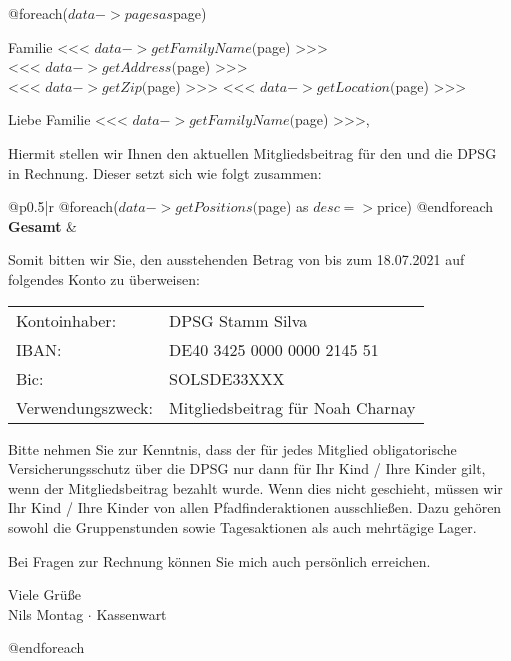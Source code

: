 \documentclass[silvaletter,12pt]{scrlttr2}
\begin{document}
@foreach($data->pages as $page)
\begin{letter}{Familie <<< $data->getFamilyName($page) >>>\\<<< $data->getAddress($page) >>>\\<<< $data->getZip($page) >>> <<< $data->getLocation($page) >>>}
    \sffamily
    \gdef\TotalHT{0}
    \opening{Liebe Familie <<< $data->getFamilyName($page) >>>,}

    Hiermit stellen wir Ihnen den aktuellen Mitgliedsbeitrag für den  und die DPSG in Rechnung. Dieser setzt sich wie folgt zusammen:

    \begin{center}
        \begin{tabular}{@{}p{}|r}
            @foreach($data->getPositions($page) as $desc => $price)
            @endforeach
            \hline
            \textbf{Gesamt} & \textbf{\numprint[€]{\TotalHT}} \\
        \end{tabular}
    \end{center}

    Somit bitten wir Sie, den ausstehenden Betrag von \totalttc bis zum 18.07.2021 auf folgendes Konto zu überweisen:

    \begin{tabular}{ll}
        Kontoinhaber: & DPSG Stamm Silva \\
        IBAN: & DE40 3425 0000 0000 2145 51 \\
        Bic: & SOLSDE33XXX \\
        Verwendungszweck: & Mitgliedsbeitrag für Noah Charnay
    \end{tabular}

    Bitte nehmen Sie zur Kenntnis, dass der für jedes Mitglied obligatorische Versicherungsschutz über die DPSG nur dann für Ihr Kind / Ihre Kinder gilt, wenn der Mitgliedsbeitrag bezahlt wurde. Wenn dies nicht geschieht, müssen wir Ihr Kind / Ihre Kinder von allen Pfadfinderaktionen ausschließen. Dazu gehören sowohl die Gruppenstunden sowie Tagesaktionen als auch mehrtägige Lager.
    
    Bei Fragen zur Rechnung können Sie mich auch persönlich erreichen.

    \closing{Viele Grüße \\ Nils Montag $\cdot$ Kassenwart}
\end{letter}
@endforeach
\end{document}
